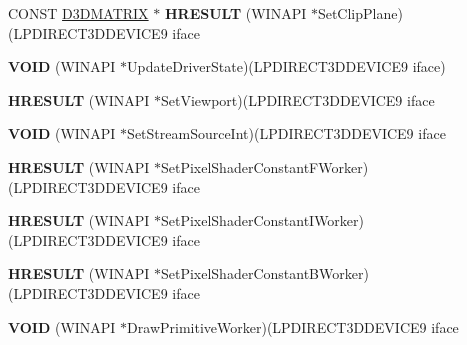 \begin{DoxyCompactItemize}
C\+O\+N\+ST \hyperlink{struct___d3_d_m_a_t_r_i_x}{D3\+D\+M\+A\+T\+R\+IX} $\ast$ {\bfseries H\+R\+E\+S\+U\+LT} (W\+I\+N\+A\+PI $\ast$Set\+Clip\+Plane)(L\+P\+D\+I\+R\+E\+C\+T3\+D\+D\+E\+V\+I\+C\+E9 iface
\item 
\mbox{\label{struct___i_direct3_d_device9_vtbl___i_n_t_a30fa2af72e6ef2b3c1c40fb1c67199f9}} 
{\bfseries V\+O\+ID} (W\+I\+N\+A\+PI $\ast$Update\+Driver\+State)(L\+P\+D\+I\+R\+E\+C\+T3\+D\+D\+E\+V\+I\+C\+E9 iface)
\item 
\mbox{\label{struct___i_direct3_d_device9_vtbl___i_n_t_a6af0d536f80f8bfa32e47e3800f6cb44}} 
{\bfseries H\+R\+E\+S\+U\+LT} (W\+I\+N\+A\+PI $\ast$Set\+Viewport)(L\+P\+D\+I\+R\+E\+C\+T3\+D\+D\+E\+V\+I\+C\+E9 iface
\item 
\mbox{\label{struct___i_direct3_d_device9_vtbl___i_n_t_a7aadcb6f1191eb8068f1ae3496b3fe86}} 
{\bfseries V\+O\+ID} (W\+I\+N\+A\+PI $\ast$Set\+Stream\+Source\+Int)(L\+P\+D\+I\+R\+E\+C\+T3\+D\+D\+E\+V\+I\+C\+E9 iface
\item 
\mbox{\label{struct___i_direct3_d_device9_vtbl___i_n_t_a07cbbebb531b8512bbe684b8c83dbbdd}} 
{\bfseries H\+R\+E\+S\+U\+LT} (W\+I\+N\+A\+PI $\ast$Set\+Pixel\+Shader\+Constant\+F\+Worker)(L\+P\+D\+I\+R\+E\+C\+T3\+D\+D\+E\+V\+I\+C\+E9 iface
\item 
\mbox{\label{struct___i_direct3_d_device9_vtbl___i_n_t_aedc7911d00b86b13aff710a2af77dadb}} 
{\bfseries H\+R\+E\+S\+U\+LT} (W\+I\+N\+A\+PI $\ast$Set\+Pixel\+Shader\+Constant\+I\+Worker)(L\+P\+D\+I\+R\+E\+C\+T3\+D\+D\+E\+V\+I\+C\+E9 iface
\item 
\mbox{\label{struct___i_direct3_d_device9_vtbl___i_n_t_ab89c523b7230e37b60e204ad20f92c12}} 
{\bfseries H\+R\+E\+S\+U\+LT} (W\+I\+N\+A\+PI $\ast$Set\+Pixel\+Shader\+Constant\+B\+Worker)(L\+P\+D\+I\+R\+E\+C\+T3\+D\+D\+E\+V\+I\+C\+E9 iface
\item 
\mbox{\label{struct___i_direct3_d_device9_vtbl___i_n_t_adc039cedf494b2ae26a7ae14c48520a3}} 
{\bfseries V\+O\+ID} (W\+I\+N\+A\+PI $\ast$Draw\+Primitive\+Worker)(L\+P\+D\+I\+R\+E\+C\+T3\+D\+D\+E\+V\+I\+C\+E9 iface

\end{DoxyCompactItemize}
